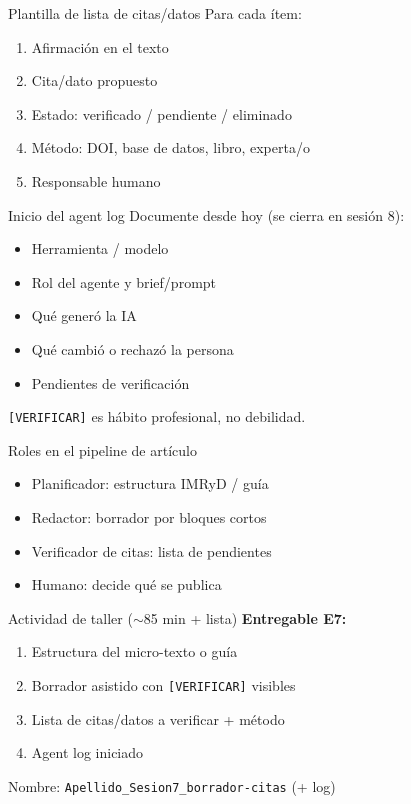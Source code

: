 \documentclass[aspectratio=169,11pt]{beamer}
\begin{document}
\begin{frame}{Plantilla de lista de citas/datos}
Para cada ítem:
\begin{enumerate}
\item Afirmación en el texto
\item Cita/dato propuesto
\item Estado: verificado / pendiente / eliminado
\item Método: DOI, base de datos, libro, experta/o
\item Responsable humano
\end{enumerate}
\end{frame}

\begin{frame}{Inicio del agent log}
Documente desde hoy (se cierra en sesión 8):
\begin{itemize}
\item Herramienta / modelo
\item Rol del agente y brief/prompt
\item Qué generó la IA
\item Qué cambió o rechazó la persona
\item Pendientes de verificación
\end{itemize}
\texttt{[VERIFICAR]} es hábito profesional, no debilidad.
\end{frame}

\begin{frame}{Roles en el pipeline de artículo}
\begin{itemize}
\item Planificador: estructura IMRyD / guía
\item Redactor: borrador por bloques cortos
\item Verificador de citas: lista de pendientes
\item Humano: decide qué se publica
\end{itemize}
\end{frame}

\begin{frame}{Actividad de taller ($\sim$85 min + lista)}
\textbf{Entregable E7:}
\begin{enumerate}
\item Estructura del micro-texto o guía
\item Borrador asistido con \texttt{[VERIFICAR]} visibles
\item Lista de citas/datos a verificar + método
\item Agent log iniciado
\end{enumerate}
Nombre: \texttt{Apellido\_Sesion7\_borrador-citas} (+ log)
\end{frame}
\end{document}
